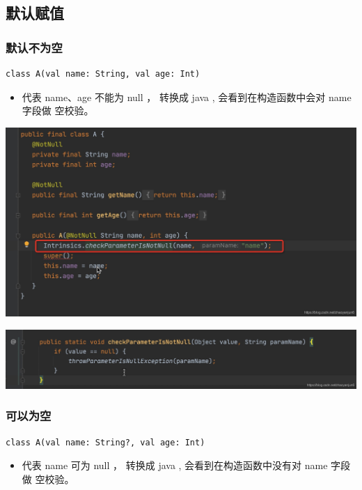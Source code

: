 \documentclass[9pt, b5paper]{article}
\begin{document}
\subsection{默认赋值}
\label{sec-5-4}
\subsubsection{默认不为空}
\label{sec-5-4-1}
\begin{verbatim}
class A(val name: String, val age: Int)
\end{verbatim}
\begin{itemize}
\item 代表 name、age 不能为 null ， 转换成 java , 会看到在构造函数中会对 name 字段做 空校验。
\end{itemize}

\includegraphics[width=.9\linewidth]{./pic/eg4.png}

\includegraphics[width=.9\linewidth]{./pic/eg5.png}

\subsubsection{可以为空}
\label{sec-5-4-2}
\begin{verbatim}
class A(val name: String?, val age: Int)
\end{verbatim}
\begin{itemize}
\item 代表 name 可为 null ， 转换成 java , 会看到在构造函数中没有对 name 字段做 空校验。
\end{itemize}
\end{document}
